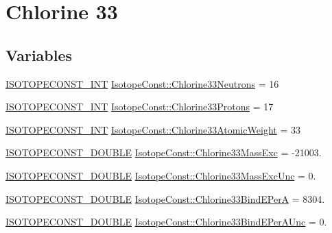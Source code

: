 \hypertarget{group___isotope_const-_chlorine-_cl33}{}\section{Chlorine 33}
\label{group___isotope_const-_chlorine-_cl33}
\subsection*{Variables}
\begin{DoxyCompactItemize}
\item 
\mbox{\hyperlink{group___isotope_const-_macros_ga5f18360b3e99483a35c32d789e62621c}{I\+S\+O\+T\+O\+P\+E\+C\+O\+N\+S\+T\+\_\+\+I\+NT}} \mbox{\hyperlink{group___isotope_const-_chlorine-_cl33_ga9209f8496e9f60d821547fe57e69eba3}{Isotope\+Const\+::\+Chlorine33\+Neutrons}} = 16
\item 
\mbox{\hyperlink{group___isotope_const-_macros_ga5f18360b3e99483a35c32d789e62621c}{I\+S\+O\+T\+O\+P\+E\+C\+O\+N\+S\+T\+\_\+\+I\+NT}} \mbox{\hyperlink{group___isotope_const-_chlorine-_cl33_gaa84405b6e44708e879ee691464d7efc6}{Isotope\+Const\+::\+Chlorine33\+Protons}} = 17
\item 
\mbox{\hyperlink{group___isotope_const-_macros_ga5f18360b3e99483a35c32d789e62621c}{I\+S\+O\+T\+O\+P\+E\+C\+O\+N\+S\+T\+\_\+\+I\+NT}} \mbox{\hyperlink{group___isotope_const-_chlorine-_cl33_ga537e672dc94be5e5972df9fff38e0579}{Isotope\+Const\+::\+Chlorine33\+Atomic\+Weight}} = 33
\item 
\mbox{\hyperlink{group___isotope_const-_macros_ga8f45a7272ce02c0b4c65c44636ed719a}{I\+S\+O\+T\+O\+P\+E\+C\+O\+N\+S\+T\+\_\+\+D\+O\+U\+B\+LE}} \mbox{\hyperlink{group___isotope_const-_chlorine-_cl33_ga2cf6bba1017e0f0635930677cd1a5cfa}{Isotope\+Const\+::\+Chlorine33\+Mass\+Exc}} = -\/21003.
\item 
\mbox{\hyperlink{group___isotope_const-_macros_ga8f45a7272ce02c0b4c65c44636ed719a}{I\+S\+O\+T\+O\+P\+E\+C\+O\+N\+S\+T\+\_\+\+D\+O\+U\+B\+LE}} \mbox{\hyperlink{group___isotope_const-_chlorine-_cl33_ga7187a77eb97be830b2961e72d1f16968}{Isotope\+Const\+::\+Chlorine33\+Mass\+Exc\+Unc}} = 0.
\item 
\mbox{\hyperlink{group___isotope_const-_macros_ga8f45a7272ce02c0b4c65c44636ed719a}{I\+S\+O\+T\+O\+P\+E\+C\+O\+N\+S\+T\+\_\+\+D\+O\+U\+B\+LE}} \mbox{\hyperlink{group___isotope_const-_chlorine-_cl33_ga4df88e9908fb93568ae9fca2e746d021}{Isotope\+Const\+::\+Chlorine33\+Bind\+E\+PerA}} = 8304.
\item 
\mbox{\hyperlink{group___isotope_const-_macros_ga8f45a7272ce02c0b4c65c44636ed719a}{I\+S\+O\+T\+O\+P\+E\+C\+O\+N\+S\+T\+\_\+\+D\+O\+U\+B\+LE}} \mbox{\hyperlink{group___isotope_const-_chlorine-_cl33_gac4fbeb2ed54bd533bdffad21eae1698c}{Isotope\+Const\+::\+Chlorine33\+Bind\+E\+Per\+A\+Unc}} = 0.

\end{DoxyCompactItemize}
